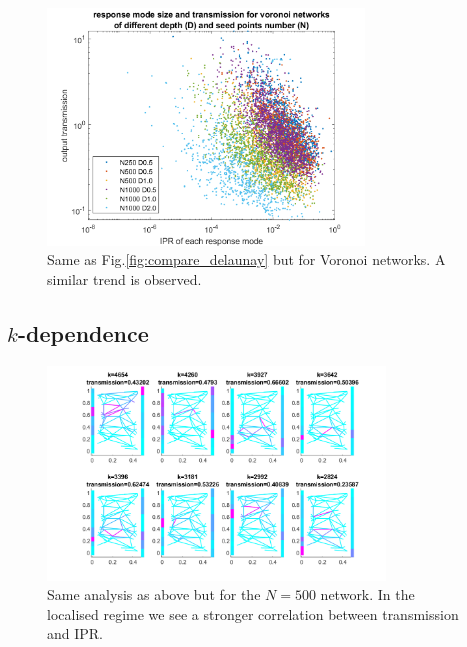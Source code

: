\begin{figure}[hbp]
  \centering
    \includegraphics[width=0.75\textwidth]{ch3/fig3/compare_voronoi.png}
    \caption{Same as Fig.\ref{fig:compare_delaunay} but for Voronoi networks. A similar trend is observed.} 
    \label{fig:compare_voronoi}
\end{figure}



\subsection{$k$-dependence}

\begin{figure}[h]
  \centering
    \includegraphics[width=0.8\textwidth]{ch3/fig3/kmodes_N50D05d.png}
    \caption{Same analysis as above but for the $N=500$ network. In the localised regime we see a stronger correlation between transmission and IPR.} 
    \label{fig:kmodes_N50D05d}
\end{figure}

